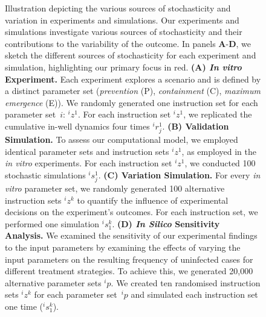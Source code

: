 \begin{figure}[p]
    \centering
    \caption{Illustration depicting the various sources of stochasticity and variation in experiments and simulations.
    Our experiments and simulations investigate various sources of stochasticity and their contributions to the variability of the outcome. In panels \textbf{A}-\textbf{D}, we sketch the different sources of stochasticity for each experiment and simulation, highlighting our primary focus in red.
    \textbf{(A) \textit{In vitro} Experiment.} Each experiment explores a scenario and is defined by a distinct parameter set (\textit{prevention} (P), \textit{containment} (C), \textit{maximum emergence} (E)). We randomly generated one instruction set for each parameter set~$i$: \ensuremath{{}^{i}\!z^{1}}. For each instruction set \ensuremath{{}^{i}\!z^{1}}, we replicated the cumulative in-well dynamics four times \ensuremath{{}^{i}\!r^{1}_{j}}.
    \textbf{(B) Validation Simulation.} To assess our computational model, we employed identical parameter sets and instruction sets \ensuremath{{}^{i}\!z^{1}}, as employed in the \textit{in vitro} experiments. For each instruction set \ensuremath{{}^{i}\!z^{1}}, we conducted 100 stochastic simulations \ensuremath{{}^{i}\!s^{1}_{j}}.
    \textbf{(C) Variation Simulation.} For every \textit{in vitro} parameter set, we randomly generated 100 alternative instruction sets \ensuremath{{}^{i}\!z^{k}} to quantify the influence of experimental decisions on the experiment's outcomes. For each instruction set, we performed one simulation \ensuremath{{}^{i}\!s^{k}_{1}}.
    \textbf{(D) \textit{In Silico} Sensitivity Analysis.} 
    We examined the sensitivity of our experimental findings to the input parameters by examining the effects of varying the input parameters on the resulting frequency of uninfected cases for different treatment strategies. To achieve this, we generated 20{,}000 alternative parameter sets \ensuremath{{}^{i}\!p}. We created ten randomised instruction sets \ensuremath{{}^{i}\!z^{k}} for each parameter set~\ensuremath{{}^{i}\!p} and simulated each instruction set one time (\ensuremath{{}^{i}\!s^{k}_{1}}).}
    \label{fig:stochs}
\end{figure}





